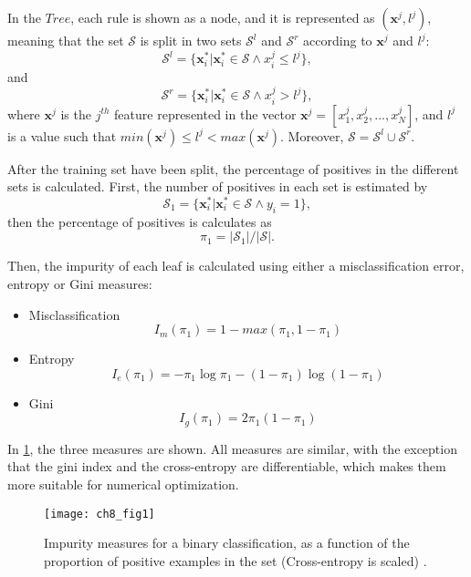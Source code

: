 In the $Tree$, each rule is shown as a node, and it is represented as $(\mathbf{x}^j,l^j)$, meaning 
that the 
set $\mathcal{S}$ is split in two sets $\mathcal{S}^l$ and $\mathcal{S}^r$ according to 
$\mathbf{x}^j$ and $l^j$:
\begin{equation}
  \mathcal{S}^l = \{\mathbf{x}_i^* \vert \mathbf{x}_i^* \in \mathcal{S} \wedge x^j_i \le l^j \},
\end{equation}
and
\begin{equation}
  \mathcal{S}^r = \{\mathbf{x}_i^* \vert \mathbf{x}_i^* \in \mathcal{S} \wedge x^j_i > l^j \},
\end{equation}
where $\mathbf{x}^j$ is the $j^{th}$ feature represented in the vector 
$\mathbf{x}^j=[x_1^j,x_2^j,...,x_N^j]$, and $l^j$ is a value such that $min(\mathbf{x}^j) \le l^j < 
max(\mathbf{x}^j)$. Moreover, $\mathcal{S} = \mathcal{S}^l \cup \mathcal{S}^r$.

After the training set have been split, the percentage of positives in the different sets is 
calculated. First, the number of positives in each set is estimated by
\begin{equation}
 \mathcal{S}_1 = \{\mathbf{x}_i^* \vert \mathbf{x}_i^* \in \mathcal{S} \wedge y_i =1 \},
\end{equation}
then the percentage of positives is calculates as
\begin{equation}
 \pi_1=\vert \mathcal{S}_1 \vert / \vert \mathcal{S} \vert.
\end{equation}

Then, the impurity of each leaf is calculated using either a misclassification error, 
entropy or Gini measures:
\begin{itemize}
 \item  Misclassification
 \begin{equation}
 I_m(\pi_1)=1-max(\pi_1,1-\pi_1)
 \end{equation}
 
 \item Entropy
 \begin{equation}
 I_e(\pi_1)=-\pi_1\log \pi_1 -(1-\pi_1) \log (1-\pi_1)
 \end{equation}
 
 \item Gini
 \begin{equation}
 I_g(\pi_1)=2\pi_1(1-\pi_1)
 \end{equation}
\end{itemize}

In \figurename{ \ref{fig:8:impurity}}, the three measures are shown. All measures are similar, with 
the exception that the gini index and the cross-entropy are differentiable, which makes them
more suitable for numerical optimization.
\begin{figure}[t!]
\texttt{[image: ch8\_fig1]}
\caption{Impurity measures for a binary classification, as a function of the proportion of
positive examples in the set (Cross-entropy is scaled) \citep{Hastie2009}.}
\label{fig:8:impurity}
\end{figure} 

